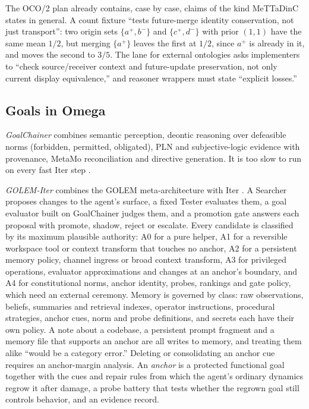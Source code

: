 \documentclass[11pt]{article}
\theoremstyle{definition}
\theoremstyle{plain}
\begin{document}
The OCO/2 plan already contains, case by case, claims of the kind MeTTaDinC states in general. A count
fixture ``tests future-merge identity conservation, not just transport'': two origin sets
$\{a^+,b^-\}$ and $\{c^+,d^-\}$ with prior $(1,1)$ have the same mean $1/2$, but merging $\{a^+\}$
leaves the first at $1/2$, since $a^+$ is already in it, and moves the second to $3/5$. The lane for external ontologies asks implementers to ``check
source/receiver context and future-update preservation, not only current display equivalence,''
and reasoner wrappers must state ``explicit losses.''

\subsection{Goals in Omega}\label{sec:goals}

\emph{GoalChainer} combines semantic perception, deontic reasoning over defeasible norms
(forbidden, permitted, obligated), PLN and subjective-logic evidence with provenance, MetaMo
reconciliation and directive generation. It is too slow to run on every fast Iter step
\cite{golemspec}.

\emph{GOLEM-Iter} combines the GOLEM meta-architecture \cite{golem} with Iter
\cite{golemspec,golemformal}. A Searcher proposes changes to the agent's surface, a fixed Tester
evaluates them, a goal evaluator built on GoalChainer judges them, and a promotion gate answers each
proposal with promote, shadow, reject or escalate. Every candidate is classified by its maximum
plausible authority: A0 for a pure helper, A1 for a reversible workspace tool or context
transform that touches no anchor, A2 for a persistent memory policy, channel ingress or broad
context transform, A3 for privileged operations, evaluator approximations and changes at an
anchor's boundary, and A4 for constitutional norms, anchor identity, probes, rankings and gate
policy, which need an external ceremony. Memory is governed by class: raw observations, beliefs,
summaries and retrieval indexes, operator instructions, procedural strategies, anchor cues, norm
and probe definitions, and secrets each have their own policy. A note about a codebase, a persistent
prompt fragment and a memory file that supports an anchor are all writes to memory, and treating
them alike ``would be a category error.'' Deleting or consolidating an anchor cue requires an
anchor-margin analysis. An \emph{anchor} is a protected functional goal together with the cues and
repair rules from which the agent's ordinary dynamics regrow it after damage, a probe battery that
tests whether the regrown goal still controls behavior, and an evidence record.
\end{document}

